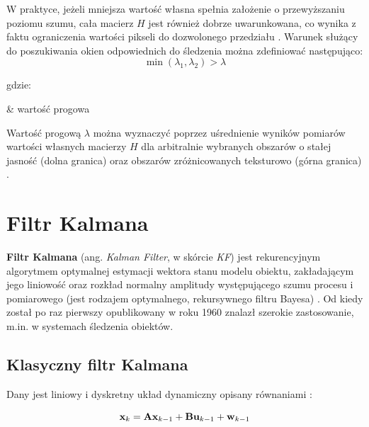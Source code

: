 W praktyce, jeżeli mniejsza wartość własna spełnia założenie o przewyższaniu poziomu szumu, cała macierz $H$ jest również dobrze uwarunkowana, co wynika z faktu ograniczenia wartości pikseli do dozwolonego przedziału \cite{Tomasi1991}. Warunek służący do poszukiwania okien odpowiednich do śledzenia można zdefiniować następująco:
\begin{equation}
\label{equ:Algorytm_Lucasa_Kanade_Tomasi_poszukiwanie_punktow}
	\min (\lambda_1, \lambda_2) > \lambda
\end{equation}

\noindent
gdzie:
\begin{conditions}
	\lambda & wartość progowa \\
\end{conditions}

Wartość progową $\lambda$ można wyznaczyć poprzez uśrednienie wyników pomiarów wartości własnych macierzy $H$ dla arbitralnie wybranych obszarów o stałej jasność (dolna granica) oraz obszarów zróżnicowanych teksturowo (górna granica) \cite{Tomasi1991}.

\citeauthor{Tomasi1991}

\section{Filtr Kalmana}
\label{sec:Filtr_Kalmana}

\textbf{Filtr Kalmana} (ang. \textit{Kalman Filter}, w skórcie \textit{KF}) jest rekurencyjnym algorytmem optymalnej estymacji wektora stanu modelu obiektu, zakładającym jego liniowość oraz rozkład normalny amplitudy występującego szumu procesu i pomiarowego (jest rodzajem optymalnego, rekursywnego filtru Bayesa) \cite{Challa2011}. Od kiedy został po raz pierwszy opublikowany w roku 1960 znalazł szerokie zastosowanie, m.in. w systemach śledzenia obiektów.

\subsection{Klasyczny filtr Kalmana}
\label{subsec:Klasyczny_filtr_Kalmana}

Dany jest liniowy i dyskretny układ dynamiczny opisany równaniami \cite{Welch1995}:

\begin{equation}
\label{equ:Filtr_Kalmana_rownanie_procesu}
	\mathbf{x}_k = \mathbf{A} \mathbf{x}_{k-1} + \mathbf{B} \mathbf{u}_{k - 1} + \mathbf{w}_{k-1}
\end{equation}

